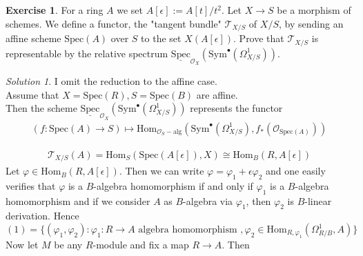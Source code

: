 \documentclass[11pt]{article}
\theoremstyle{definition}
\newtheorem{exercise}{Exercise}
\theoremstyle{remark}
\newtheorem*{solution}{Solution}
\begin{document}
\setcounter{equation}{0}
\begin{exercise}
For a ring $A$ we set $A[\epsilon] := A[t]/t^2$.
Let $X\rightarrow S$ be a morphism of schemes. We define a functor, the "tangent bundle" $\mathcal{T}_{X/S}$ of $X/S$, by sending an affine scheme $\text{Spec}(A)$ over $S$ to the set $X(A[\epsilon])$. Prove that $\mathcal{T}_{X/S}$ is representable by the relative spectrum $\underline{\text{Spec}}_{\mathcal{O}_X}(\text{Sym}^\bullet(\Omega_{X/S}^1))$.
\end{exercise}
\begin{solution}
I omit the reduction to the affine case.\\

Assume that $X= \text{Spec}(R), S=\text{Spec}(B)$ are affine.\\
Then the scheme $\underline{\text{Spec}}_{\mathcal{O}_X}(\text{Sym}^\bullet(\Omega_{X/S}^1))$ represents the functor 
\begin{align*}
(f: \text{Spec}(A) \rightarrow S) \mapsto \text{Hom}_{\mathcal{O}_S-\text{alg}}(\text{Sym}^\bullet(\Omega_{X/S}^1), f_*(\mathcal{O}_{\text{Spec}(A)}))
\end{align*} 


\begin{align}
\mathcal{T}_{X/S}(A) = \text{Hom}_S(\text{Spec}(A[\epsilon]), X) \cong \text{Hom}_B(R, A[\epsilon]) 
\end{align}
Let $\varphi \in \text{Hom}_B(R, A[\epsilon]) $. Then we can write $\varphi = \varphi_1 + \epsilon \varphi_2$ and one easily verifies that $\varphi$ is a $B$-algebra homomorphism if and only if $\varphi_1$ is a $B$-algebra homomorphism and if we consider $A$ as $B$-algebra via $\varphi_1$, then $\varphi_2$ is $B$-linear derivation. Hence 
$$ (1) = \{(\varphi_1, \varphi_2) : \varphi_1 : R \rightarrow A \text{ algebra homomorphism }, \varphi_2 \in \text{Hom}_{R,\varphi_1}(\Omega_{R / B}^1, A)\}$$
Now let $M$ be any $R$-module and fix a map $R \rightarrow A$. Then
\end{solution}
\end{document}
